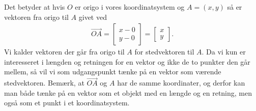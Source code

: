 Det betyder at hvis $O$ er origo i vores koordinatsystem og $A=(x,y)$ så er vektoren fra origo til $A$ givet ved
\begin{align*}
\overrightarrow{OA}= \begin{bmatrix}x-0 \\y - 0\end{bmatrix}= \begin{bmatrix}x \\y\end{bmatrix}.
\end{align*}
Vi kalder vektoren der går fra origo til $A$ for stedvektoren til $A$. Da vi kun er interesseret i længden og retningen for en vektor og ikke de to punkter den går mellem, så vil vi som udgangspunkt tænke på en vektor som værende stedvektoren. Bemærk, at $\overrightarrow{OA}$ og $A$ har de samme koordinater, og derfor kan man både tænke på en vektor som et objekt med en længde og en retning, men også som et punkt i et koordinatsystem.

